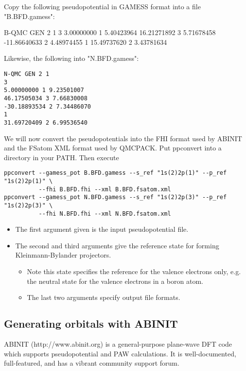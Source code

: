 Copy the following pseudopotential in GAMESS format into a file "B.BFD.gamess":
\begin{lstcpp}
B-QMC GEN 2 1
3
3.00000000 1 5.40423964
16.21271892 3 5.71678458
-11.86640633 2 4.48974455
1
15.49737620 2 3.43781634
\end{lstcpp}

Likewise, the following into "N.BFD.gamess":
\begin{verbatim}
N-QMC GEN 2 1
3
5.00000000 1 9.23501007
46.17505034 3 7.66830008
-30.18893534 2 7.34486070
1
31.69720409 2 6.99536540
\end{verbatim}

We will now convert the pseudopotentials into the FHI format used by ABINIT and the FSatom XML format used by QMCPACK. Put ppconvert into a directory in your PATH. Then execute
\begin{verbatim}
ppconvert --gamess_pot B.BFD.gamess --s_ref "1s(2)2p(1)" --p_ref "1s(2)2p(1)" \
          --fhi B.BFD.fhi --xml B.BFD.fsatom.xml
ppconvert --gamess_pot N.BFD.gamess --s_ref "1s(2)2p(3)" --p_ref "1s(2)2p(3)" \
          --fhi N.BFD.fhi --xml N.BFD.fsatom.xml
\end{verbatim}
\begin{itemize}
  \item{} The first argument given is the input pseudopotential file.
  \item{} The second and third arguments give the reference state for forming Kleinmann-Bylander projectors.
  \begin{itemize}
    \item{} Note this state specifies the reference for the valence electrons only, e.g. the neutral state for the valence electrons in a boron atom.
    \item{} The last two arguments specify output file formats. 
  \end{itemize}
\end{itemize}

\subsection*{Generating orbitals with ABINIT}
ABINIT (http://www.abinit.org) is a general-purpose plane-wave DFT code which supports pseudopotential and PAW calculations.  It is well-documented, full-featured, and has a vibrant community support forum.

